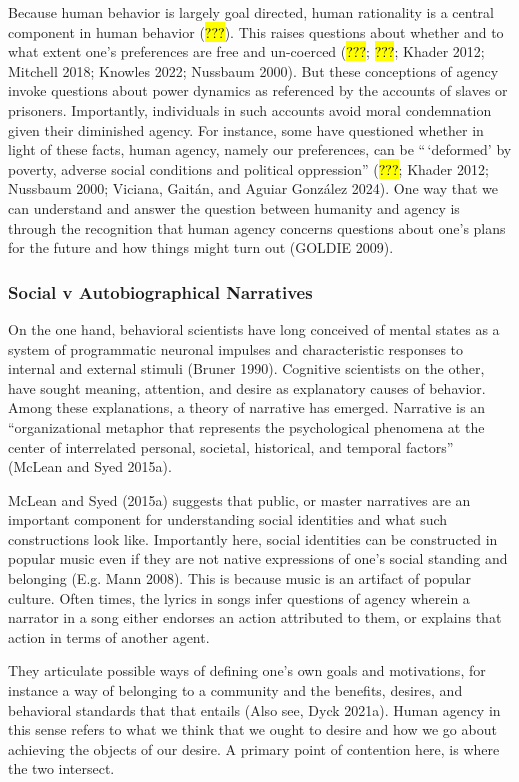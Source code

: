 \documentclass[
  letterpaper,
  DIV=11,
  numbers=noendperiod]{scrartcl}
\theoremstyle{remark}
\begin{document}
Because human behavior is largely goal directed, human rationality is a
central component in human behavior (\hl{???}). This raises questions
about whether and to what extent one's preferences are free and
un-coerced (\hl{???}; \hl{???}; Khader 2012; Mitchell 2018; Knowles
2022; Nussbaum 2000). But these conceptions of agency invoke questions
about power dynamics as referenced by the accounts of slaves or
prisoners. Importantly, individuals in such accounts avoid moral
condemnation given their diminished agency. For instance, some have
questioned whether in light of these facts, human agency, namely our
preferences, can be ``\,`deformed' by poverty, adverse social conditions
and political oppression'' (\hl{???}; Khader 2012; Nussbaum 2000;
Viciana, Gaitán, and Aguiar González 2024). One way that we can
understand and answer the question between humanity and agency is
through the recognition that human agency concerns questions about one's
plans for the future and how things might turn out (GOLDIE 2009).

\subsubsection{Social v Autobiographical
Narratives}\label{social-v-autobiographical-narratives}

On the one hand, behavioral scientists have long conceived of mental
states as a system of programmatic neuronal impulses and characteristic
responses to internal and external stimuli (Bruner 1990). Cognitive
scientists on the other, have sought meaning, attention, and desire as
explanatory causes of behavior. Among these explanations, a theory of
narrative has emerged. Narrative is an ``organizational metaphor that
represents the psychological phenomena at the center of interrelated
personal, societal, historical, and temporal factors'' (McLean and Syed
2015a).

McLean and Syed (2015a) suggests that public, or master narratives are
an important component for understanding social identities and what such
constructions look like. Importantly here, social identities can be
constructed in popular music even if they are not native expressions of
one's social standing and belonging (E.g. Mann 2008). This is because
music is an artifact of popular culture. Often times, the lyrics in
songs infer questions of agency wherein a narrator in a song either
endorses an action attributed to them, or explains that action in terms
of another agent.

They articulate possible ways of defining one's own goals and
motivations, for instance a way of belonging to a community and the
benefits, desires, and behavioral standards that that entails (Also see,
Dyck 2021a). Human agency in this sense refers to what we think that we
ought to desire and how we go about achieving the objects of our desire.
A primary point of contention here, is where the two intersect.
\end{document}
